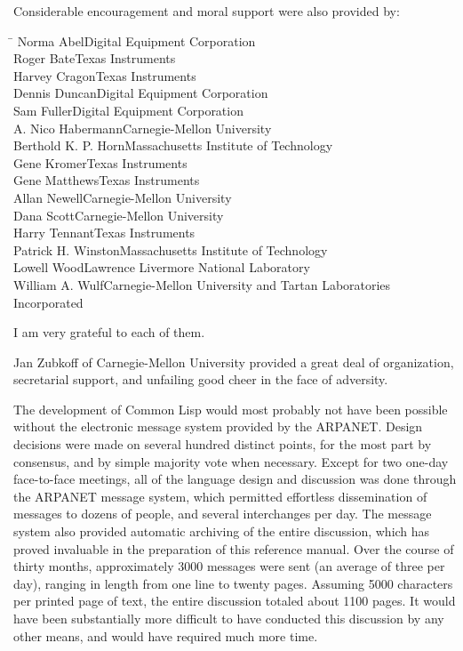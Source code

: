 Considerable encouragement and moral support were also provided by:
\begin{tabbing}
\hskip1.5in\=\kill
Norma Abel\>Digital Equipment Corporation \\
Roger Bate\>Texas Instruments \\
Harvey Cragon\>Texas Instruments \\
Dennis Duncan\>Digital Equipment Corporation \\
Sam Fuller\>Digital Equipment Corporation \\
A. Nico Habermann\>Carnegie-Mellon University \\
Berthold K. P. Horn\>Massachusetts Institute of Technology \\
Gene Kromer\>Texas Instruments \\
Gene Matthews\>Texas Instruments \\
Allan Newell\>Carnegie-Mellon University \\
Dana Scott\>Carnegie-Mellon University \\
Harry Tennant\>Texas Instruments \\
Patrick H. Winston\>Massachusetts Institute of Technology \\
Lowell Wood\>Lawrence Livermore National Laboratory \\
William A. Wulf\>Carnegie-Mellon University and Tartan Laboratories \\
               \>Incorporated
\end{tabbing}
I am very grateful to each of them.

Jan Zubkoff of Carnegie-Mellon University
provided a great deal of organization,
secretarial support, and unfailing good cheer in the face of adversity.

The development of Common Lisp would most probably not have been possible
without the electronic message system provided by the ARPANET.
Design decisions were made on several hundred distinct points, for the
most part by consensus, and by simple majority vote when necessary.
Except for two one-day face-to-face meetings, all of the language design
and discussion was done through the {ARPANET} message system, which
permitted effortless dissemination of messages to dozens of people, and
several interchanges per day.  The message system also provided
automatic archiving of the entire discussion, which has proved
invaluable in the preparation of this reference manual.  Over the course
of thirty months, approximately 3000 messages were sent (an average of
three per day), ranging in length from one line to twenty pages.
Assuming 5000 characters per printed page of text, the entire
discussion totaled about 1100 pages.  It would have been substantially
more difficult to have conducted this discussion by any other means,
and would have required much more time.

